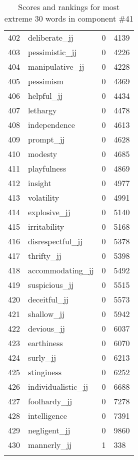 \begin{longtable}[!htbp]{| rlr@{.}l |}
    402 & deliberate\_jj & 0 & 4139 \\
    403 & pessimistic\_jj & 0 & 4226 \\
    404 & manipulative\_jj & 0 & 4228 \\
    405 & pessimism & 0 & 4369 \\
    406 & helpful\_jj & 0 & 4434 \\
    407 & lethargy & 0 & 4478 \\
    408 & independence & 0 & 4613 \\
    409 & prompt\_jj & 0 & 4628 \\
    410 & modesty & 0 & 4685 \\
    411 & playfulness & 0 & 4869 \\
    412 & insight & 0 & 4977 \\
    413 & volatility & 0 & 4991 \\
    414 & explosive\_jj & 0 & 5140 \\
    415 & irritability & 0 & 5168 \\
    416 & disrespectful\_jj & 0 & 5378 \\
    417 & thrifty\_jj & 0 & 5398 \\
    418 & accommodating\_jj & 0 & 5492 \\
    419 & suspicious\_jj & 0 & 5515 \\
    420 & deceitful\_jj & 0 & 5573 \\
    421 & shallow\_jj & 0 & 5942 \\
    422 & devious\_jj & 0 & 6037 \\
    423 & earthiness & 0 & 6070 \\
    424 & surly\_jj & 0 & 6213 \\
    425 & stinginess & 0 & 6252 \\
    426 & individualistic\_jj & 0 & 6688 \\
    427 & foolhardy\_jj & 0 & 7278 \\
    428 & intelligence & 0 & 7391 \\
    429 & negligent\_jj & 0 & 9860 \\
    430 & mannerly\_jj & 1 & 338 \\
    \hline
    \caption{Scores and rankings for most extreme 30 words in component \#41} \\
\end{longtable}
